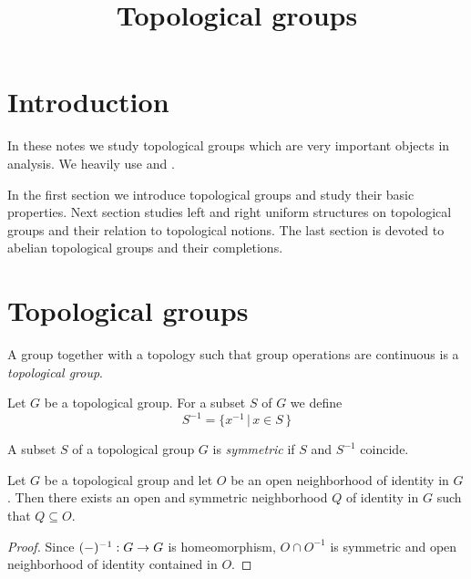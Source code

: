 \documentclass[10pt]{amsart}
\begin{document}
\title{Topological groups}
\date{}
\maketitle

\section{Introduction}
\noindent
In these notes we study topological groups which are very important objects in analysis. We heavily use \cite{Topological_Spaces} and \cite{Uniform_Spaces}.

In the first section we introduce topological groups and study their basic properties. Next section studies left and right uniform structures on topological groups and their relation to topological notions. The last section is devoted to abelian topological groups and their completions.

\section{Topological groups}

\begin{definition}
	A group together with a topology such that group operations are continuous is a \textit{topological group}.
\end{definition}
\noindent
Let $G$ be a topological group. For a subset $S$ of $G$ we define
$$S^{-1} = \big\{x^{-1}\,\big|\,x\in S\,\big\}$$

\begin{definition}
	A subset $S$ of a topological group $G$ is \textit{symmetric} if $S$ and $S^{-1}$ coincide.
\end{definition}

\begin{fact}\label{fact:symmetric_neighborhoods_of_unit_generate_base}
	Let $G$ be a topological group and let $O$ be an open neighborhood of identity in $G$. Then there exists an open and symmetric neighborhood $Q$ of identity in $G$ such that $Q\subseteq O$.
\end{fact}
\begin{proof}
	Since $(-)^{-1}:G\rightarrow G$ is homeomorphism, $O \cap O^{-1}$ is symmetric and open neighborhood of identity contained in $O$.
\end{proof}
\end{document}
